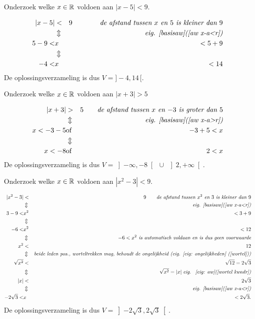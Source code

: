 \documentclass[numbers,wordchoicegiven]{ximera}
\begin{document}
\begin{problem} Onderzoek welke $x\in \mathbb{R}$ voldoen aan $|x-5|<9.$
		\begin{oplossing} 
			\begin{eqnarray*}
				|x-5|&<&9 \qquad\qquad \textit{de afstand tussen $x$ en $5$ is kleiner dan $9$}\\
				&\Updownarrow &\textit{eig. \ref{basisaw}(\ref{aw x-a<r})}\\
				5-9<&x&<5+9\\
				&\Updownarrow &\\
				-4<&x&<14
			\end{eqnarray*}
			De oplossingsverzameling is dus $V=]-4,14\,[.$
		\end{oplossing}
	\end{problem}
\begin{problem}	Onderzoek welke $x\in \mathbb{R}$ voldoen aan $|x+3|>5$
		\begin{oplossing} 
			\begin{eqnarray*}
				|x+3|&>&5 \qquad \textit{de afstand tussen $x$ en $-3$ is groter dan $5$}\\
				&\Updownarrow &\textit{eig. \ref{basisaw}(\ref{aw x-a>r})}
				\\x<-3-5&\mbox{of}&-3+5<x\\
				&\Updownarrow &\\
				x<-8&\mbox{of}&2<x
			\end{eqnarray*}
			De oplossingsverzameling is dus $V=\left]-\infty,-8\right[
			\;\cup\;\left]2, +\infty\right[.$
		\end{oplossing}
\end{problem}
\begin{problem}	Onderzoek welke $x\in \mathbb{R}$ voldoen aan $|x^2-3|<9$.
		\begin{oplossing}
			\begin{eqnarray*}|x^2-3|&<&9 \qquad \textit{de afstand tussen $x^2$ en $3$ is
					kleiner dan $9$}\\&\Updownarrow &\textit{eig.
					\ref{basisaw}(\ref{aw x-a<r})}
				\\3-9<&x^2&<3+9\\&\Updownarrow
				&\\-6<&x^2&<12\\&\Updownarrow&\textit{$-6<x^2$ is automatisch
					voldaan en is dus geen
					voorwaarde}\\x^2&<&12\\&\Updownarrow&\textit{beide leden pos.,
					worteltrekken mag, behoudt de ongelijkheid (eig. \ref{eig:
						ongelijkheden}
					(\ref{wortel}))}\\\sqrt{x^2}&<&\sqrt{12}=2\sqrt{3}\\&\Updownarrow
				&\qquad \sqrt{x^2}=|x| \;\textit{eig. ~\ref{eig: aw}(\ref{wortel
						kwadr})}\\|x|&<&2\sqrt{3}
				\\&\Updownarrow &\textit{eig. \ref{basisaw}(\ref{aw x-a<r})}\\-2\sqrt{3}<&x&<2\sqrt{3}.
			\end{eqnarray*}
			De oplossingsverzameling is dus $\displaystyle
			V=\left]-2\sqrt{3},2\sqrt{3}\right[.$
		\end{oplossing}
\end{problem}
\end{document}
